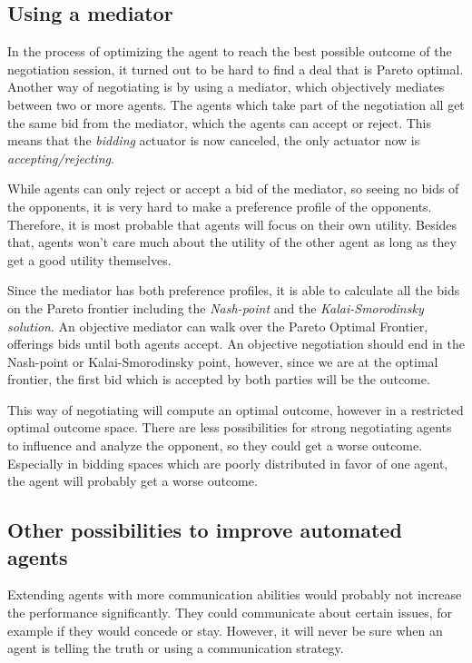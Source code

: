 \subsection{Using a mediator}
In the process of optimizing the agent to reach the best possible outcome of the negotiation session, it turned out to be hard to find a deal that is Pareto optimal. Another way of negotiating is by using a mediator, which objectively mediates between two or more agents. The agents which take part of the negotiation all get the same bid from the mediator, which the agents can accept or reject. This means that the \textit{bidding} actuator is now canceled, the only actuator now is \textit{accepting/rejecting}.

While agents can only reject or accept a bid of the mediator, so seeing no bids of the opponents, it is very hard to make a preference profile of the opponents. Therefore, it is most probable that agents will focus on their own utility. Besides that, agents won't care much about the utility of the other agent as long as they get a good utility themselves. 

Since the mediator has both preference profiles, it is able to calculate all the bids on the Pareto frontier including the \emph{Nash-point} and the \emph{Kalai-Smorodinsky solution}. An objective mediator can walk over the Pareto Optimal Frontier, offerings bids until both agents accept. An objective negotiation should end in the Nash-point or Kalai-Smorodinsky point, however, since we are at the optimal frontier, the first bid which is accepted by both parties will be the outcome.

This way of negotiating will compute an optimal outcome, however in a restricted optimal outcome space. There are less possibilities for strong negotiating agents to influence and analyze the opponent, so they could get a worse outcome. Especially in bidding spaces which are poorly distributed in favor of one agent, the agent will probably get a worse outcome.

\subsection{Other possibilities to improve automated agents}
Extending agents with more communication abilities would probably not increase the performance significantly. They could
communicate about certain issues, for example if they would concede or stay. However, it will never be sure when an agent is telling the truth or using a communication strategy. 

